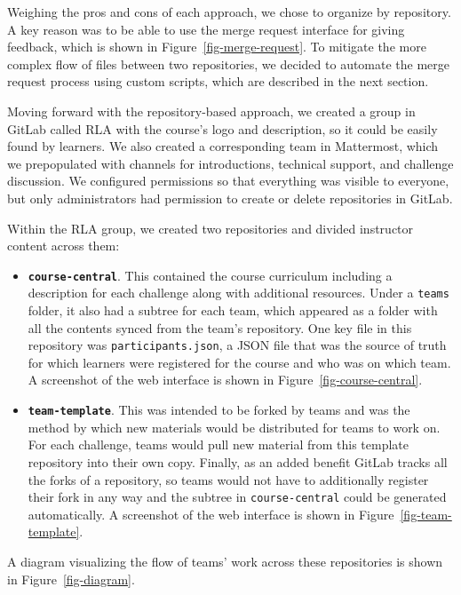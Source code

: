 \documentclass[12pt,twoside]{mitthesis}
\begin{document}
Weighing the pros and cons of each approach, we chose to organize by repository. A key reason was to be able to use the merge request interface for giving feedback, which is shown in Figure~\ref{fig-merge-request}. To mitigate the more complex flow of files between two repositories, we decided to automate the merge request process using custom scripts, which are described in the next section.

Moving forward with the repository-based approach, we created a group in GitLab called RLA with the course's logo and description, so it could be easily found by learners. We also created a corresponding team in Mattermost, which we prepopulated with channels for introductions, technical support, and challenge discussion. We configured permissions so that everything was visible to everyone, but only administrators had permission to create or delete repositories in GitLab.

Within the RLA group, we created two repositories and divided instructor content across them:
\begin{itemize}
	\item \textbf{\texttt{course-central}}. This contained the course curriculum including a description for each challenge along with additional resources. Under a \texttt{teams} folder, it also had a subtree for each team, which appeared as a folder with all the contents synced from the team's repository. One key file in this repository was \texttt{participants.json}, a JSON file that was the source of truth for which learners were registered for the course and who was on which team. A screenshot of the web interface is shown in Figure~\ref{fig-course-central}.
	\item \textbf{\texttt{team-template}}. This was intended to be forked by teams and was the method by which new materials would be distributed for teams to work on. For each challenge, teams would pull new material from this template repository into their own copy. Finally, as an added benefit GitLab tracks all the forks of a repository, so teams would not have to additionally register their fork in any way and the subtree in \texttt{course-central} could be generated automatically. A screenshot of the web interface is shown in Figure~\ref{fig-team-template}.
\end{itemize}
A diagram visualizing the flow of teams' work across these repositories is shown in Figure~\ref{fig-diagram}.
\end{document}
